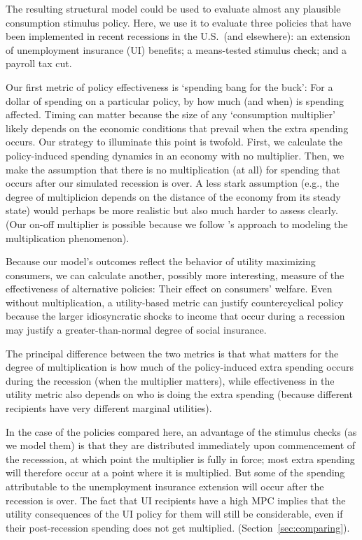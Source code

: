 \documentclass[../HAFiscal]{subfiles}
\begin{document}
The resulting structural model could be used to evaluate almost any plausible consumption stimulus policy.  Here, we use it to evaluate three policies that have been implemented in recent recessions in the U.S.\ (and elsewhere): an extension of unemployment insurance (UI) benefits; a means-tested stimulus check; and a payroll tax cut.

Our first metric of policy effectiveness is `spending bang for the buck': For a dollar of spending on a particular policy, by how much (and when) is spending affected.  Timing can matter because the size of any `consumption multiplier' likely depends on the economic conditions that prevail when the extra spending occurs.  Our strategy to illuminate this point is twofold.  First, we calculate the policy-induced spending dynamics in an economy with no multiplier.  Then, we make the assumption that there is no multiplication (at all) for spending that occurs after our simulated recession is over.  A less stark assumption (e.g., the degree of multiplicion depends on the distance of the economy from its steady state) would perhaps be more realistic but also much harder to assess clearly.  (Our on-off multiplier is possible because we follow \cite{kmpHandbook2016}'s approach to modeling the multiplication phenomenon).

Because our model's outcomes reflect the behavior of utility maximizing consumers, we can calculate another, possibly more interesting, measure of the effectiveness of alternative policies:  Their effect on consumers' welfare.  Even without multiplication, a utility-based metric can justify countercyclical policy because the larger idiosyncratic shocks to income that occur during a recession may justify a greater-than-normal degree of social insurance.

The principal difference between the two metrics is that what matters for the degree of multiplication is how much of the policy-induced extra spending occurs during the recession (when the multiplier matters), while effectiveness in the utility metric also depends on who is doing the extra spending (because different recipients have very different marginal utilities).  

In the case of the policies compared here, an advantage of the stimulus checks (as we model them) is that they are distributed immediately upon commencement of the recesssion, at which point the multiplier is fully in force; most extra spending will therefore occur at a point where it is multiplied.  But some of the spending attributable to the unemployment insurance extension will occur after the recession is over.  The fact that UI recipients have a high MPC implies that the utility consequences of the UI policy for them will still be considerable, even if their post-recession spending does not get multiplied.  (Section~\ref{sec:comparing}).
\end{document}
